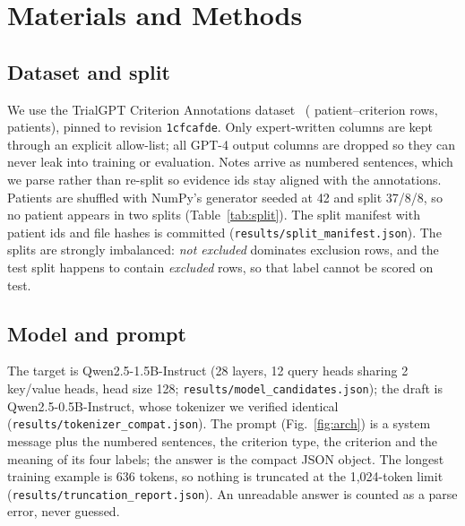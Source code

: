\documentclass[conference]{IEEEtran}
\newcommand{\code}[1]{\texttt{\small #1}}
\begin{document}
\section{Materials and Methods}

\subsection{Dataset and split}
We use the TrialGPT Criterion Annotations dataset~\cite{trialgptdata} (\TotalRows{} patient--criterion rows, \TotalPatients{} patients), pinned to revision \code{1cfcafde}. Only expert-written columns are kept through an explicit allow-list; all GPT-4 output columns are dropped so they can never leak into training or evaluation. Notes arrive as numbered sentences, which we parse rather than re-split so evidence ids stay aligned with the annotations. Patients are shuffled with NumPy's generator seeded at 42 and split 37/8/8, so no patient appears in two splits (Table~\ref{tab:split}). The split manifest with patient ids and file hashes is committed (\code{results/split\_manifest.json}). The splits are strongly imbalanced: \emph{not excluded} dominates exclusion rows, and the test split happens to contain \TestExcluded{} \emph{excluded} rows, so that label cannot be scored on test.



\subsection{Model and prompt}
The target is Qwen2.5-1.5B-Instruct (28 layers, 12 query heads sharing 2 key/value heads, head size 128; \code{results/model\_candidates.json}); the draft is Qwen2.5-0.5B-Instruct, whose tokenizer we verified identical (\code{results/tokenizer\_compat.json}). The prompt (Fig.~\ref{fig:arch}) is a system message plus the numbered sentences, the criterion type, the criterion and the meaning of its four labels; the answer is the compact JSON object. The longest training example is 636 tokens, so nothing is truncated at the 1,024-token limit (\code{results/truncation\_report.json}). An unreadable answer is counted as a parse error, never guessed.
\end{document}
